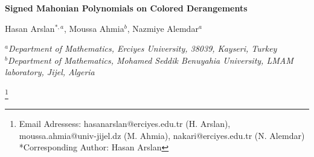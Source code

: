 \documentclass[a4paper,12pt]{article}
\date{\today}
\newcommand\blfootnote[1]{%
	\begingroup
	\renewcommand\thefootnote{}\footnote{#1}%
	\addtocounter{footnote}{-1}%
	\endgroup
}
\begin{document}
		
	\begin{center}
		{\Large \textbf{Signed Mahonian Polynomials on Colored Derangements}} \vspace*{0.5cm}
	\end{center}
	
	\begin{center}
		Hasan Arslan$^{*,a}$, Moussa Ahmia$^{b}$, Nazmiye Alemdar$^{a}$ 
	\end{center}
	\begin{center}
		$^{a}${\small {\textit{Department of  Mathematics, Erciyes University, 38039, Kayseri, Turkey}}}\\
		$^{b}${\small {\textit{Department of  Mathematics, Mohamed Seddik Benuyahia University, LMAM laboratory, Jijel, Algeria}}}\\
	\end{center}
	
	\blfootnote{Email Adressess: hasanarslan@erciyes.edu.tr (H. Arslan),  moussa.ahmia@univ-jijel.dz (M. Ahmia), nakari@erciyes.edu.tr (N. Alemdar)\\
		*Corresponding Author: Hasan Arslan}
	
		
		\begin{abstract}
The polynomial $\sum_{\pi \in W}q^{maj(\pi)}$ of major index over a classical Weyl group $W$ with a generating set $S$ is called the Mahonian polynomial over $W$, and also the polynomial $\sum_{\pi \in W}(-1)^{l(\pi)}q^{maj(\pi)}$ of major index together with sign over the group $W$ is called the signed Mahonian polynomial over the group $W$, where $l$ is the length function on $W$ defined in terms of the generating set $S$. We concern with the signed Mahonian polynomial 
$$\sum_{\pi \in D_{n}^{(c)}}(-1)^{L(\pi)}q^{fmaj(\pi)}$$ 
on the set $D_{n}^{(c)}$ of colored derangements in the group $G_{c,n}$ of colored permutations, where $L$ denotes the length function defined by means of a complex root system described by Bremke and Malle in $G_{c,n}$ and $fmaj$ defined by Adin and Roichman in $G_{c,n}$ represents the \textit{flag-major index}, which is a Mahonian statistic. As an application of the formula for signed Mahonian polynomials on the set of colored derangements, we will derive a formula to count colored derangements of even length in $G_{c,n}$ when $c$ is an even number. Finally, we conclude by providing a formula for the difference between the number of derangements of even and odd lengths in $G_{c,n}$ for every positive integer $c$, regardless of whether c is odd or even.
			
		\end{abstract}
		
\end{document}
